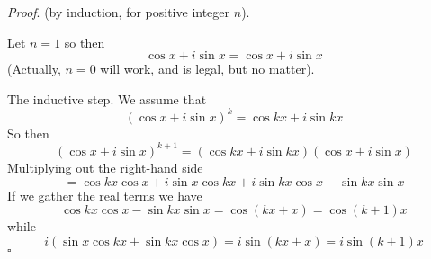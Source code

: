 \documentclass[11pt, oneside]{article}
\begin{document}
\emph{Proof}.  (by induction, for positive integer $n$).

Let $n = 1$ so then
\[ \cos x + i \sin x = \cos x + i \sin x \]
(Actually, $n = 0$ will work, and is legal, but no matter).

The inductive step.  We assume that
\[ (\cos x + i \sin x)^k = \cos kx + i \sin kx \]
So then
\[ (\cos x + i \sin x)^{k+1} = (\cos kx + i \sin kx)(\cos x + i \sin x) \]
Multiplying out the right-hand side
\[ = \cos kx \cos x + i \sin x \cos kx + i \sin kx \cos x - \sin kx \sin x \]
If we gather the real terms we have
\[ \cos kx \cos x - \sin kx \sin x = \cos (kx + x) = \cos (k+1)x \]
while
\[ i (\sin x \cos kx + \sin kx \cos x) = i \sin (kx + x) = i \sin (k+1) x \]
$\square$
\end{document}
